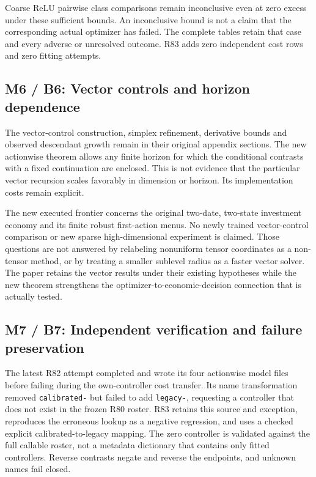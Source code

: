 Coarse ReLU pairwise class comparisons remain inconclusive even at zero
excess under these sufficient bounds. An inconclusive bound is not a
claim that the corresponding actual optimizer has failed. The complete
tables retain that case and every adverse or unresolved outcome. R83
adds zero independent cost rows and zero fitting attempts.

\hypertarget{m6-b6-vector-controls-and-horizon-dependence}{%
\subsection{M6 / B6: Vector controls and horizon
dependence}\label{m6-b6-vector-controls-and-horizon-dependence}}

The vector-control construction, simplex refinement, derivative bounds
and observed descendant growth remain in their original appendix
sections. The new actionwise theorem allows any finite horizon for which
the conditional contrasts with a fixed continuation are enclosed. This
is not evidence that the particular vector recursion scales favorably in
dimension or horizon. Its implementation costs remain explicit.

The new executed frontier concerns the original two-date, two-state
investment economy and its finite robust first-action menus. No newly
trained vector-control comparison or new sparse high-dimensional
experiment is claimed. Those questions are not answered by relabeling
nonuniform tensor coordinates as a non-tensor method, or by treating a
smaller sublevel radius as a faster vector solver. The paper retains the
vector results under their existing hypotheses while the new theorem
strengthens the optimizer-to-economic-decision connection that is
actually tested.

\hypertarget{m7-b7-independent-verification-and-failure-preservation}{%
\subsection{M7 / B7: Independent verification and failure
preservation}\label{m7-b7-independent-verification-and-failure-preservation}}

The latest R82 attempt completed and wrote its four actionwise model
files before failing during the own-controller cost transfer. Its name
transformation removed \texttt{calibrated-} but failed to add
\texttt{legacy-}, requesting a controller that does not exist in the
frozen R80 roster. R83 retains this source and exception, reproduces the
erroneous lookup as a negative regression, and uses a checked explicit
calibrated-to-legacy mapping. The zero controller is validated against
the full callable roster, not a metadata dictionary that contains only
fitted controllers. Reverse contrasts negate and reverse the endpoints,
and unknown names fail closed.

